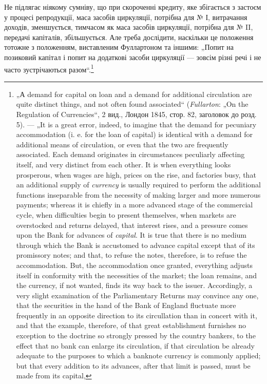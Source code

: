 Не підлягає ніякому сумніву, що при скороченні кредиту,
яке збігається з застоєм у процесі репродукції, маса засобів
циркуляції, потрібна для № І, витрачання доходів, зменшується,
тимчасом як маса засобів циркуляції, потрібна для № II, передачі капіталів, збільшується. Але треба
дослідити, наскільки
це положення тотожне з положенням, виставленим Фуллартоном
та іншими: „Попит на позиковий капітал і попит на додаткові
засоби циркуляції — зовсім різні речі і не часто зустрічаються
разом“.\footnote{
„А demand for capital on loan and a demand for additional circulation are
quite distinct things, and not often found associated“ (\emph{Fullarton}: „On the Regulation of
Currencies“, 2 вид., Лондон 1845, стор. 82, заголовок до розд. 5). — „It is
a great error, indeed, to imagine that the demand for pecuniary accommodation (i. e.
for the loan of capital) is identical with a demand for additional means of circulation,
or even that the two are frequently associated. Each demand originates in circumstances peculiarly
affecting itself, and very distinct from each other. It is when everything looks prosperous, when wages are high, prices on the rise, and factories
busy, that an additional supply of \emph{currency} is usually required to perform the additional functions
inseparable from the necessity of making larger and more numerous payments; whereas it is chiefly in
a more advanced stage of the commercial
cycle, when difficulties begin to present themselves, when markets are overstocked
and returns delayed, that interest rises, and a pressure comes upon the Bank for
advances of \emph{capital}. It is true that there is no medium through which the Bank is
accustomed to advance capital except that of its promissory notes; and that, to
refuse the notes, therefore, is to refuse the accommodation. But, the accommodation
once granted, everything adjusts itself in conformity with the necessities of the
market; the loan remains, and the currency, if not wanted, finds its way back to
the issuer. Accordingly, a very slight examination of the Parliamentary Returns
may convince any one, that the securities in the hand of the Bank of England
fluctuate more frequently in an opposite direction to its circullation than in concert
with it, and that the example, therefore, of that great establishment furnishes no
exception to the doctrine so strongly pressed by the country bankers, to the effect
that no bank can enlarge its circulation, if that circulation be already adequate to
the purposes to which a banknote currency is commonly applied; but that every
addition to its advances, after that limit is passed, must be made from its capital,
}
